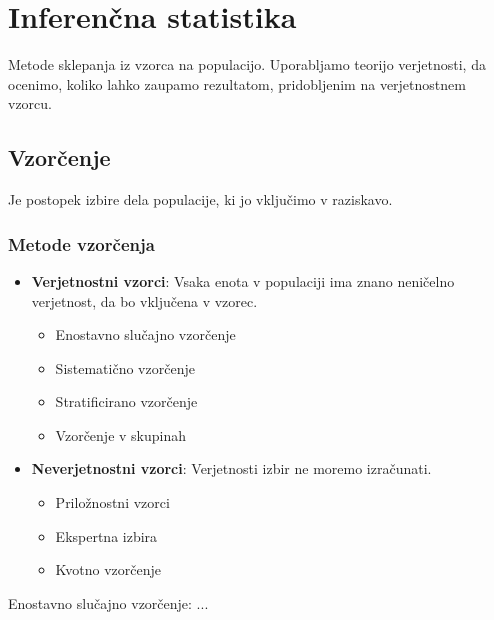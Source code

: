 \section{Inferenčna statistika}

Metode sklepanja iz vzorca na populacijo. Uporabljamo teorijo verjetnosti, da ocenimo, koliko lahko zaupamo rezultatom, pridobljenim na verjetnostnem vzorcu.

\subsection*{Vzorčenje}

Je postopek izbire dela populacije, ki jo vključimo v raziskavo.

\subsubsection*{Metode vzorčenja}
\begin{itemize}
    \item \textbf{Verjetnostni vzorci}: Vsaka enota v populaciji ima znano neničelno verjetnost, da bo vključena v vzorec.
    \begin{itemize}
        \item Enostavno slučajno vzorčenje
        \item Sistematično vzorčenje
        \item Stratificirano vzorčenje
        \item Vzorčenje v skupinah
    \end{itemize}
    \item \textbf{Neverjetnostni vzorci}: Verjetnosti izbir ne moremo izračunati.
    \begin{itemize}
        \item Priložnostni vzorci
        \item Ekspertna izbira
        \item Kvotno vzorčenje
    \end{itemize}
\end{itemize}

Enostavno slučajno vzorčenje:
...